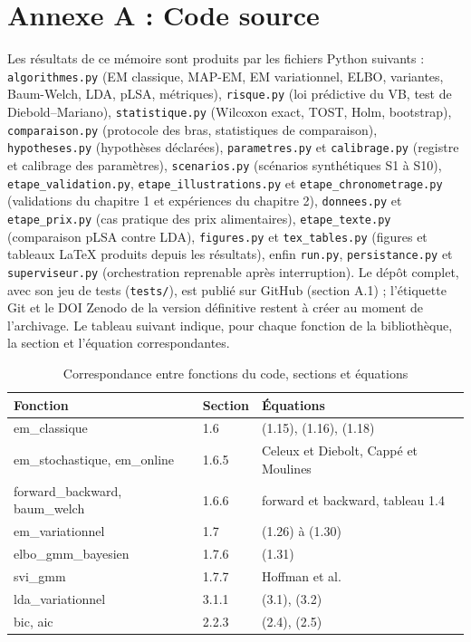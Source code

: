 \section*{Annexe A : Code source}
Les résultats de ce mémoire sont produits par les fichiers Python suivants : \texttt{algorithmes.py} (EM classique, MAP-EM, EM variationnel, ELBO, variantes, Baum-Welch, LDA, pLSA, métriques), \texttt{risque.py} (loi prédictive du VB, test de Diebold--Mariano), \texttt{statistique.py} (Wilcoxon exact, TOST, Holm, bootstrap), \texttt{comparaison.py} (protocole des bras, statistiques de comparaison), \texttt{hypotheses.py} (hypothèses déclarées), \texttt{parametres.py} et \texttt{calibrage.py} (registre et calibrage des paramètres), \texttt{scenarios.py} (scénarios synthétiques S1 à S10), \texttt{etape\_validation.py}, \texttt{etape\_illustrations.py} et \texttt{etape\_chronometrage.py} (validations du chapitre 1 et expériences du chapitre 2), \texttt{donnees.py} et \texttt{etape\_prix.py} (cas pratique des prix alimentaires), \texttt{etape\_texte.py} (comparaison pLSA contre LDA), \texttt{figures.py} et \texttt{tex\_tables.py} (figures et tableaux \LaTeX{} produits depuis les résultats), enfin \texttt{run.py}, \texttt{persistance.py} et \texttt{superviseur.py} (orchestration reprenable après interruption). Le dépôt complet, avec son jeu de tests (\texttt{tests/}), est publié sur GitHub (section A.1) ; l'étiquette Git et le DOI Zenodo de la version définitive restent à créer au moment de l'archivage. Le tableau suivant indique, pour chaque fonction de la bibliothèque, la section et l'équation correspondantes.

\begin{table}[H]
\centering
\small
\setlength{\tabcolsep}{0.14cm}
\begin{tabular}{|p{5.2cm}|p{4.4cm}|p{5.2cm}|}
\hline
\textbf{Fonction} & \textbf{Section} & \textbf{Équations} \\
\hline
em\_classique & 1.6 & (1.15), (1.16), (1.18) \\
\hline
em\_stochastique, em\_online & 1.6.5 & Celeux et Diebolt, Cappé et Moulines \\
\hline
forward\_backward, baum\_welch & 1.6.6 & forward et backward, tableau 1.4 \\
\hline
em\_variationnel & 1.7 & (1.26) à (1.30) \\
\hline
elbo\_gmm\_bayesien & 1.7.6 & (1.31) \\
\hline
svi\_gmm & 1.7.7 & Hoffman et al. \\
\hline
lda\_variationnel & 3.1.1 & (3.1), (3.2) \\
\hline
bic, aic & 2.2.3 & (2.4), (2.5) \\
\hline
\end{tabular}
\caption{Correspondance entre fonctions du code, sections et équations}
\end{table}

